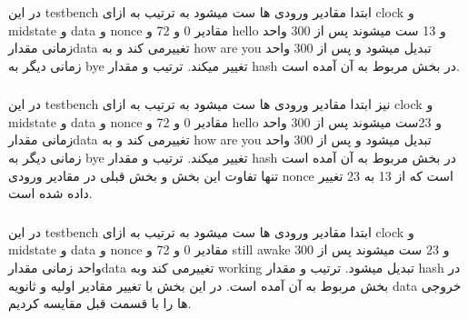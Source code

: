 در این testbench ابتدا مقادیر ورودی ها ست میشود
به ترتیب به ازای clock  و midstate و data و nonce مقادیر 0 و 72 و hello و 13 ست میشوند
پس از 300 واحد زمانی مقدارdata تغییرمی کند و به how are you تبدیل میشود و پس از 300 واحد زمانی دیگر به bye تغییر میکند.
ترتیب و مقدار hash در بخش مربوط به آن آمده است.

\subsubsection{}

در این testbench نیز ابتدا مقادیر ورودی ها ست میشود
به ترتیب به ازای clock  و midstate و data و nonce مقادیر 0 و 72 و hello و 23ست میشوند
پس از 300 واحد زمانی مقدارdata تغییرمی کند و به how are you تبدیل میشود و پس از 300 واحد زمانی دیگر به bye تغییر میکند.
ترتیب و مقدار hash در بخش مربوط به آن آمده است
تنها تفاوت این بخش و بخش قبلی در مقادیر ورودی nonce است که از 13 به 23 تغییر داده شده است.


\subsubsection{}
در این testbench ابتدا مقادیر ورودی ها ست میشود
به ترتیب به ازای clock  و midstate و data و nonce مقادیر 0 و 72 و still awake و 23 ست میشوند
پس از 300 واحد زمانی مقدارdata تغییرمی کند وبه working تبدیل میشود.
ترتیب و مقدار hash در بخش مربوط به آن آمده است.
در این بخش با تغییر مقادیر اولیه و ثانویه data خروجی ها را با قسمت قبل مقایسه کردیم.

